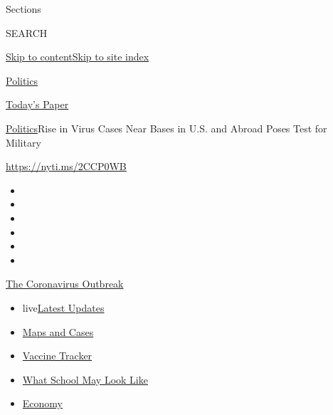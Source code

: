 Sections

SEARCH

\protect\hyperlink{site-content}{Skip to
content}\protect\hyperlink{site-index}{Skip to site index}

\href{https://www.nytimes.com/section/politics}{Politics}

\href{https://myaccount.nytimes.com/auth/login?response_type=cookie\&client_id=vi}{}

\href{https://www.nytimes.com/section/todayspaper}{Today's Paper}

\href{/section/politics}{Politics}\textbar{}Rise in Virus Cases Near
Bases in U.S. and Abroad Poses Test for Military

\url{https://nyti.ms/2CCP0WB}

\begin{itemize}
\item
\item
\item
\item
\item
\item
\end{itemize}

\href{https://www.nytimes.com/news-event/coronavirus?action=click\&pgtype=Article\&state=default\&region=TOP_BANNER\&context=storylines_menu}{The
Coronavirus Outbreak}

\begin{itemize}
\tightlist
\item
  live\href{https://www.nytimes.com/2020/08/01/world/coronavirus-covid-19.html?action=click\&pgtype=Article\&state=default\&region=TOP_BANNER\&context=storylines_menu}{Latest
  Updates}
\item
  \href{https://www.nytimes.com/interactive/2020/us/coronavirus-us-cases.html?action=click\&pgtype=Article\&state=default\&region=TOP_BANNER\&context=storylines_menu}{Maps
  and Cases}
\item
  \href{https://www.nytimes.com/interactive/2020/science/coronavirus-vaccine-tracker.html?action=click\&pgtype=Article\&state=default\&region=TOP_BANNER\&context=storylines_menu}{Vaccine
  Tracker}
\item
  \href{https://www.nytimes.com/interactive/2020/07/29/us/schools-reopening-coronavirus.html?action=click\&pgtype=Article\&state=default\&region=TOP_BANNER\&context=storylines_menu}{What
  School May Look Like}
\item
  \href{https://www.nytimes.com/live/2020/07/31/business/stock-market-today-coronavirus?action=click\&pgtype=Article\&state=default\&region=TOP_BANNER\&context=storylines_menu}{Economy}
\end{itemize}


